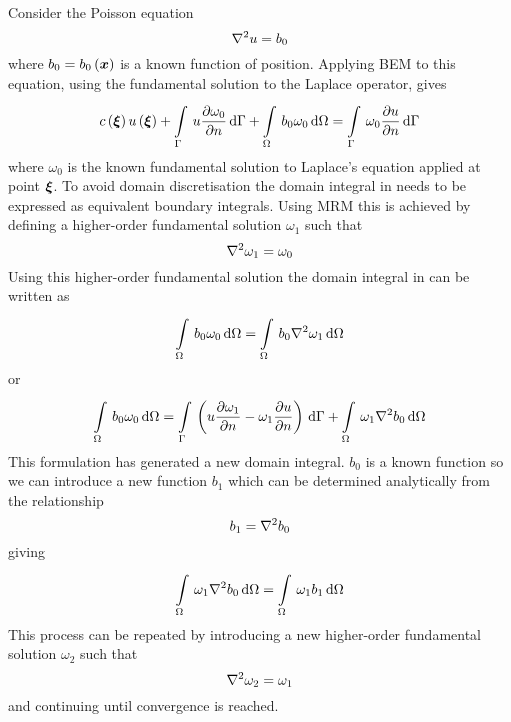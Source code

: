   Consider the Poisson equation
\begin{equation}
  \laplacian{}{u} = b_{0}
\end{equation}
where $b_{0} = \fnof{b_{0}}{\vect{x}}$ is a known function of position.
Applying BEM to this equation, using the fundamental solution to the Laplace
operator, gives
\begin{equation}
  \fnof{c}{\vect{\xi}} \fnof{u}{\vect{\xi}} + 
  \goneint{u \delby{\omega_{0}}{n}}{\Gamma} + 
  \goneint{b_{0} \omega_{0}}{\Omega} = \goneint{\omega_{0} \delby{u}{n}}{\Gamma}
\label{eq:mrmstart}
\end{equation}
where $\omega_{0}$ is the known fundamental solution to Laplace's equation
applied at point $\vect{\xi}$.  To avoid domain discretisation the domain integral
in  needs to be expressed as equivalent boundary
integrals.  Using MRM this is achieved by defining a higher-order
fundamental solution $\omega_{1}$ such that
\begin{equation}
  \laplacian{}{\omega_{1}} = \omega_{0}
\end{equation}
Using this higher-order fundamental solution the domain integral in
 can be written as
\begin{equation}
  \goneint{b_{0} \omega_{0}}{\Omega} =
  \goneint{b_{0}\laplacian{}{\omega_{1}}}{\Omega} 
\end{equation}
or 
\begin{equation}
  \goneint{b_{0} \omega_{0}}{\Omega} = 
  \goneint{\pbrac{u \delby{\omega_{1}}{n} - \omega_{1} \delby{u}{n}}}{\Gamma} +
  \goneint{\omega_{1} \laplacian{}{b_{0}}}{\Omega}
\label{eq:delb}
\end{equation}
This formulation has generated a new domain integral.  $b_{0}$ is a known
function so we can introduce a new function $b_{1}$ which can be determined
analytically from the relationship
\begin{equation}
  b_{1} = \laplacian{}{b_{0}}
\end{equation}
giving 
\begin{equation}
  \goneint{\omega_{1} \laplacian{}{b_{0}}}{\Omega} = 
  \goneint{\omega_{1} b_{1}}{\Omega}
\end{equation}
This process can be repeated by introducing a new higher-order fundamental
solution $\omega_{2}$ such that
\begin{equation}
  \laplacian{}{\omega_{2}} = \omega_{1}
\end{equation}
and continuing until convergence is reached.

